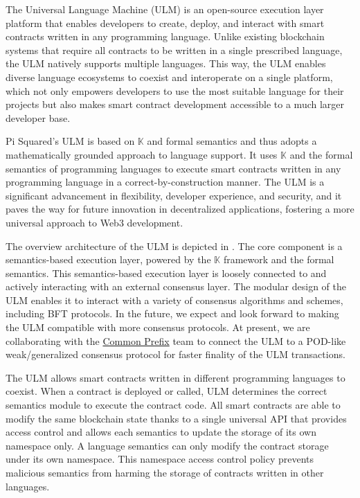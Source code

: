\documentclass{article}
\newcommand{\K}{\ensuremath{\mathbb{K}}\xspace}
\begin{document}
The Universal Language Machine (ULM) is an open-source execution layer
platform that enables developers to create, deploy, and interact with smart contracts written in any programming language.
Unlike existing blockchain systems that require all contracts to be written in a single prescribed language, the ULM natively supports multiple languages.
This way,
the ULM enables diverse language ecosystems to coexist and interoperate on a single platform,
which not only empowers developers to use the most suitable language for their projects
but also makes smart contract development accessible to a much larger developer base.

Pi Squared's ULM is based on \K and formal semantics and thus adopts a mathematically grounded approach to
language support.
It uses \K and the formal semantics of programming languages to execute smart contracts written
in any programming language in a correct-by-construction manner.
The ULM is a significant advancement in flexibility, developer experience, and security,
and it paves the way for future innovation in decentralized applications,
fostering a more universal approach to Web3 development.


The overview architecture of the ULM is depicted in .
The core component is a semantics-based execution layer, powered by the \K framework and the formal semantics.
This semantics-based execution layer is loosely connected to and
actively interacting with an external consensus layer.
The modular design of the ULM enables it to interact with a variety of consensus algorithms and schemes, including BFT protocols.
In the future, we expect and look forward to making the ULM compatible with more consensus protocols.
At present, we are collaborating with the \href{https://www.commonprefix.com/}{Common Prefix} team
to connect the ULM to a POD-like weak/generalized consensus protocol for faster finality of the ULM transactions.

The ULM allows smart contracts written in different programming languages to coexist.
When a contract is deployed or called, ULM determines the correct semantics module 
to execute the contract code.
All smart contracts are able to modify the same blockchain state thanks to
a single universal API that provides access control and allows each semantics to update the storage of its own namespace only.
A language semantics can only modify the contract storage under its own namespace.
This namespace access control policy prevents malicious semantics from harming the storage of contracts written in other languages.
\end{document}
